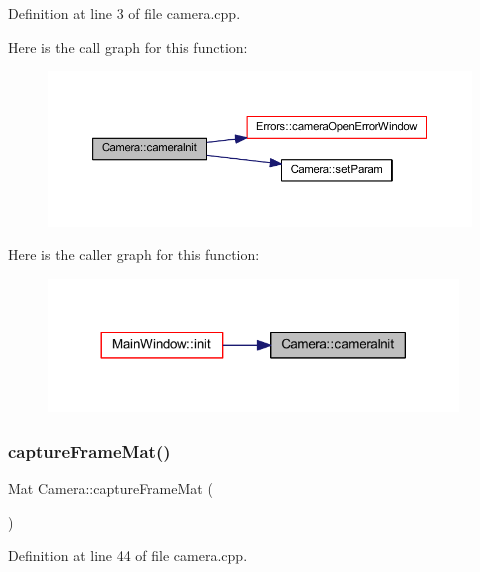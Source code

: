 Definition at line 3 of file camera.\+cpp.

Here is the call graph for this function\+:\nopagebreak
\begin{figure}[H]
\begin{center}
\leavevmode
\includegraphics[width=350pt]{class_camera_a6d17b81a1e987db60f5144d922f54e9d_cgraph}
\end{center}
\end{figure}
Here is the caller graph for this function\+:\nopagebreak
\begin{figure}[H]
\begin{center}
\leavevmode
\includegraphics[width=308pt]{class_camera_a6d17b81a1e987db60f5144d922f54e9d_icgraph}
\end{center}
\end{figure}
\mbox{\label{class_camera_abfa965e4380023e2295edd9a13f4ee63}} 
\subsubsection{\texorpdfstring{captureFrameMat()}{captureFrameMat()}}
{\footnotesize\ttfamily Mat Camera\+::capture\+Frame\+Mat (\begin{DoxyParamCaption}{ }\end{DoxyParamCaption})}



Definition at line 44 of file camera.\+cpp.

